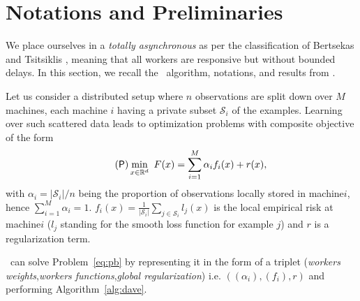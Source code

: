 \section{Notations and Preliminaries}\label{sec:distributed-prelim}

We place ourselves in a \emph{totally asynchronous} as per the classification of Bertsekas and Tsitsiklis \cite[Chap.]{bertsekas1989parallel}, meaning that all workers are responsive but without bounded delays. In this section, we recall the \dave~algorithm, notations, and results from \cite{mishchenko2019distributed}. 

Let us consider a distributed setup where $n$ observations are split down over $M$ machines, each machine $i$ having a private subset $\mathcal{S}_i$ of the examples.
Learning over such scattered data leads to optimization problems with composite objective of the form
\begin{align}\label{eq:pb}
\tag{$\mathsf{P}$}
\min_{x\in\mathbb{R}^d}  ~ F(x) =  \sum_{i=1}^M  \alpha_i  f_i(x)  +  r(x),
\end{align}
with $\alpha_i= |\mathcal{S}_i|/n$ being the proportion of observations locally stored in machine\;$i$, hence $\sum_{i=1}^M\alpha_i = 1$. $f_i(x) = \frac{1}{|\mathcal{S}_i|}  \sum_{j\in\mathcal{S}_i}l_j(x) $ is the local empirical risk at machine\;$i$ ($l_j$ standing for the smooth loss function for example $j$) and $r$ is a regularization term.

\dave~can solve Problem~\eqref{eq:pb} by representing it in the form of a triplet (\emph{workers weights},\emph{workers functions},\emph{global regularization}) i.e. $((\alpha_i),(f_i),r)$ and performing Algorithm~\ref{alg:dave}.



